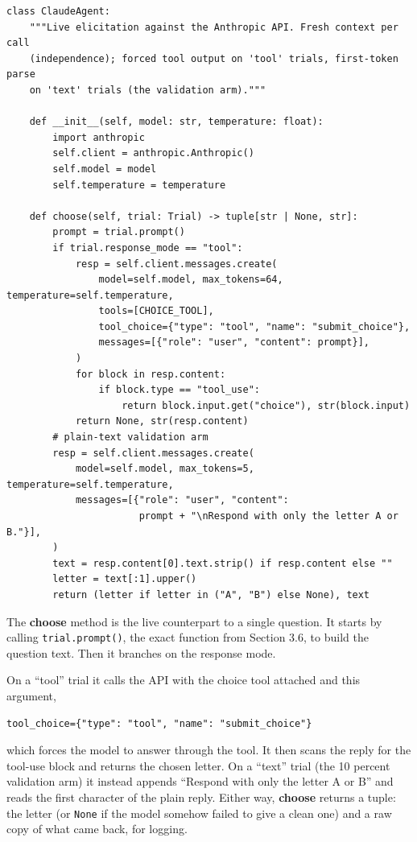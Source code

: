 \documentclass[11pt]{article}
\newcommand{\file}[1]{\textbf{\ttfamily #1}}
\begin{document}
\begin{lstlisting}[style=py,firstnumber=73]
class ClaudeAgent:
    """Live elicitation against the Anthropic API. Fresh context per call
    (independence); forced tool output on 'tool' trials, first-token parse
    on 'text' trials (the validation arm)."""

    def __init__(self, model: str, temperature: float):
        import anthropic
        self.client = anthropic.Anthropic()
        self.model = model
        self.temperature = temperature

    def choose(self, trial: Trial) -> tuple[str | None, str]:
        prompt = trial.prompt()
        if trial.response_mode == "tool":
            resp = self.client.messages.create(
                model=self.model, max_tokens=64, temperature=self.temperature,
                tools=[CHOICE_TOOL],
                tool_choice={"type": "tool", "name": "submit_choice"},
                messages=[{"role": "user", "content": prompt}],
            )
            for block in resp.content:
                if block.type == "tool_use":
                    return block.input.get("choice"), str(block.input)
            return None, str(resp.content)
        # plain-text validation arm
        resp = self.client.messages.create(
            model=self.model, max_tokens=5, temperature=self.temperature,
            messages=[{"role": "user", "content":
                       prompt + "\nRespond with only the letter A or B."}],
        )
        text = resp.content[0].text.strip() if resp.content else ""
        letter = text[:1].upper()
        return (letter if letter in ("A", "B") else None), text
\end{lstlisting}

The \file{choose} method is the live counterpart to a single question. It starts by calling
\verb|trial.prompt()|, the exact function from Section 3.6, to build the question text. Then it
branches on the response mode.

On a ``tool'' trial it calls the API with the choice tool attached and this argument,

\begin{lstlisting}[style=sh]
tool_choice={"type": "tool", "name": "submit_choice"}
\end{lstlisting}

which forces the model to answer through the tool. It then scans the reply for the tool-use block and returns the chosen letter. On a
``text'' trial (the 10 percent validation arm) it instead appends ``Respond with only the letter A or
B'' and reads the first character of the plain reply. Either way, \file{choose} returns a tuple: the
letter (or \verb|None| if the model somehow failed to give a clean one) and a raw copy of what came
back, for logging.
\end{document}
